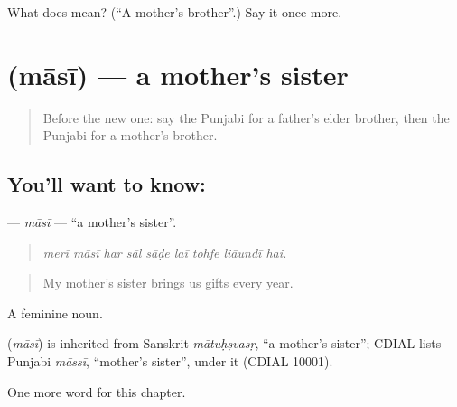 \begin{tcolorbox}[breakable,colback=teal!4,colframe=teal!35!black,title={Before you move on}]
What does  mean? (\textquotedblleft{}A mother's brother\textquotedblright{}.) Say it once more.
\end{tcolorbox}
\section[\texorpdfstring{\pa{ਮਾਸੀ} (māsī)}{ਮਾਸੀ (māsī)}]{ (māsī) — a mother's sister}

\label{lesson:PA-C331-masi}



\begin{quote}
Before the new one: say the Punjabi for a father's elder brother, then the Punjabi for a mother's brother.
\end{quote}

\subsection*{You'll want to know: }
\textbf{} — \emph{māsī} — \textquotedblleft{}a mother's sister\textquotedblright{}.

\begin{quote}
        
\end{quote}

\begin{quote}
\emph{merī māsī har sāl sāḍe laī tohfe liāundī hai.}
\end{quote}

\begin{quote}
My mother's sister brings us gifts every year.
\end{quote}

A feminine noun.

\begin{cousinweb}
\textbf{} (\emph{māsī}) is inherited from Sanskrit \emph{mātuḥṣvasṛ}, \textquotedblleft{}a mother's sister\textquotedblright{}; CDIAL lists Punjabi \emph{māssī}, \textquotedblleft{}mother's sister\textquotedblright{}, under it (CDIAL 10001).
\end{cousinweb}

\begin{grammarlens}[title={What you've built}]
One more word for this chapter.
\end{grammarlens}

